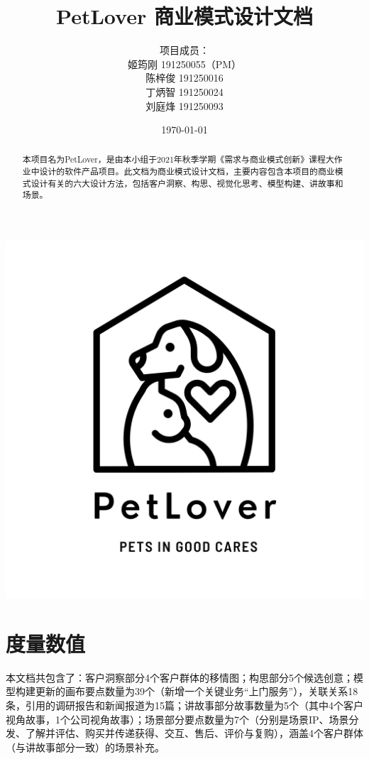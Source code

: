 \documentclass[a4paper]{ctexart}
\title{\Huge PetLover 商业模式设计文档}
\author{
  项目成员：\\
  姬筠刚 191250055（PM）\\
  陈梓俊 191250016\\
  丁炳智 191250024\\
  刘庭烽 191250093\\
}
\date{\today}
\begin{document}
\maketitle

\centerline{\includegraphics[]{logo.png}}

\newpage

\begin{abstract}
  本项目名为PetLover，是由本小组于2021年秋季学期《需求与商业模式创新》课程大作业中设计的软件产品项目。此文档为商业模式设计文档，主要内容包含本项目的商业模式设计有关的六大设计方法，包括客户洞察、构思、视觉化思考、模型构建、讲故事和场景。
\end{abstract}



\tableofcontents

\newpage

\setlength{\parskip}{1em}


\section{度量数值}

本文档共包含了：客户洞察部分4个客户群体的移情图；构思部分5个候选创意；模型构建更新的画布要点数量为39个（新增一个关键业务“上门服务”），关联关系18条，引用的调研报告和新闻报道为15篇；讲故事部分故事数量为5个（其中4个客户视角故事，1个公司视角故事）；场景部分要点数量为7个（分别是场景IP、场景分发、了解并评估、购买并传递获得、交互、售后、评价与复购），涵盖4个客户群体（与讲故事部分一致）的场景补充。
\end{document}
